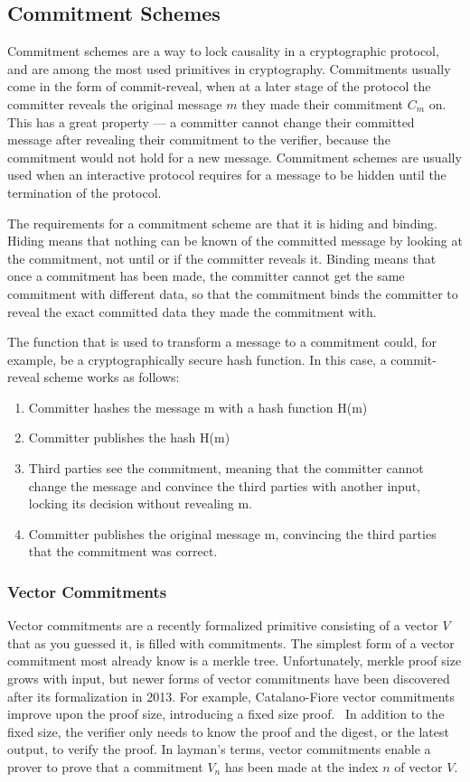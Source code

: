 \subsection{Commitment Schemes}
Commitment schemes are a way to lock causality in a cryptographic protocol, and are among the most used primitives in cryptography. Commitments usually come in the form of commit-reveal, when at a later stage of the protocol the committer reveals the original message \(m\) they made their commitment \(C_m\) on. This has a great property --- a committer cannot change their committed message after revealing their commitment to the verifier, because the commitment would not hold for a new message. Commitment schemes are usually used when an interactive protocol requires for a message to be hidden until the termination of the protocol.

The requirements for a commitment scheme are that it is hiding and binding. Hiding means that nothing can be known of the committed message by looking at the commitment, not until or if the committer reveals it. Binding means that once a commitment has been made, the committer cannot get the same commitment with different data, so that the commitment binds the committer to reveal the exact committed data they made the commitment with.

The function that is used to transform a message to a commitment could, for example, be a cryptographically secure hash function. In this case, a commit-reveal scheme works as follows:

\begin{enumerate}
  \item Committer hashes the message m with a hash function H(m)
  \item Committer publishes the hash H(m)
  \item Third parties see the commitment, meaning that the committer cannot change the message and convince the third parties with another input, locking its decision without revealing m.
  \item Committer publishes the original message m, convincing the third parties that the commitment was correct.
\end{enumerate}


\subsubsection{Vector Commitments}
Vector commitments are a recently formalized primitive consisting of a vector \(V\) that as you guessed it, is filled with commitments. The simplest form of a vector commitment most already know is a merkle tree. Unfortunately, merkle proof size grows with input, but newer forms of vector commitments have been discovered after its formalization in 2013. For example, Catalano-Fiore vector commitments improve upon the proof size, introducing a fixed size proof.~\cite{Catalano2013-jn} In addition to the fixed size, the verifier only needs to know the proof and the digest, or the latest output, to verify the proof. In layman's terms, vector commitments enable a prover to prove that a commitment \(V_n\) has been made at the index \(n\) of vector \(V\).

